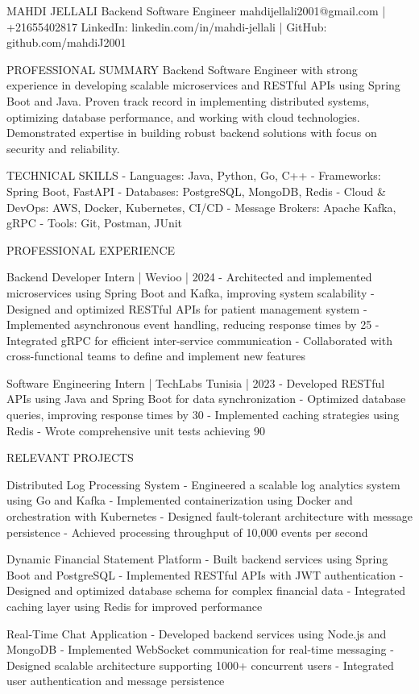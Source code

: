 MAHDI JELLALI
Backend Software Engineer
mahdijellali2001@gmail.com | +21655402817
LinkedIn: linkedin.com/in/mahdi-jellali | GitHub: github.com/mahdiJ2001

PROFESSIONAL SUMMARY
Backend Software Engineer with strong experience in developing scalable microservices and RESTful APIs using Spring Boot and Java. Proven track record in implementing distributed systems, optimizing database performance, and working with cloud technologies. Demonstrated expertise in building robust backend solutions with focus on security and reliability.

TECHNICAL SKILLS
- Languages: Java, Python, Go, C++
- Frameworks: Spring Boot, FastAPI
- Databases: PostgreSQL, MongoDB, Redis
- Cloud & DevOps: AWS, Docker, Kubernetes, CI/CD
- Message Brokers: Apache Kafka, gRPC
- Tools: Git, Postman, JUnit

PROFESSIONAL EXPERIENCE

Backend Developer Intern | Wevioo | 2024
- Architected and implemented microservices using Spring Boot and Kafka, improving system scalability
- Designed and optimized RESTful APIs for patient management system
- Implemented asynchronous event handling, reducing response times by 25%
- Integrated gRPC for efficient inter-service communication
- Collaborated with cross-functional teams to define and implement new features

Software Engineering Intern | TechLabs Tunisia | 2023
- Developed RESTful APIs using Java and Spring Boot for data synchronization
- Optimized database queries, improving response times by 30%
- Implemented caching strategies using Redis
- Wrote comprehensive unit tests achieving 90%

RELEVANT PROJECTS

Distributed Log Processing System
- Engineered a scalable log analytics system using Go and Kafka
- Implemented containerization using Docker and orchestration with Kubernetes
- Designed fault-tolerant architecture with message persistence
- Achieved processing throughput of 10,000 events per second

Dynamic Financial Statement Platform
- Built backend services using Spring Boot and PostgreSQL
- Implemented RESTful APIs with JWT authentication
- Designed and optimized database schema for complex financial data
- Integrated caching layer using Redis for improved performance

Real-Time Chat Application
- Developed backend services using Node.js and MongoDB
- Implemented WebSocket communication for real-time messaging
- Designed scalable architecture supporting 1000+ concurrent users
- Integrated user authentication and message persistence

